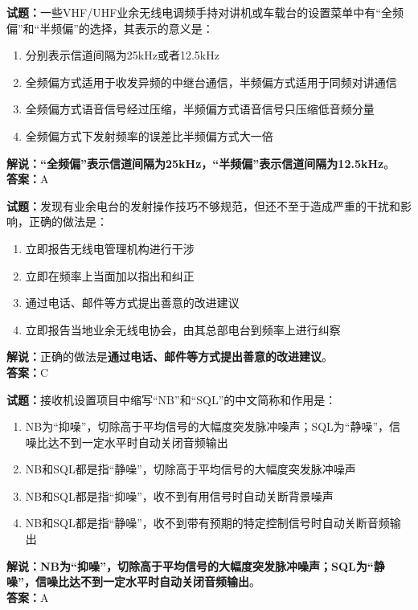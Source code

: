 \documentclass{ctexbook}
\begin{document}
\bigskip


\noindent\textbf{试题：}一些VHF/UHF业余无线电调频手持对讲机或车载台的设置菜单中有“全频偏”和“半频偏”的选择，其表示的意义是：
\begin{enumerate}[leftmargin=3em]
\item 分别表示信道间隔为25kHz或者12.5kHz
\item 全频偏方式适用于收发异频的中继台通信，半频偏方式适用于同频对讲通信
\item 全频偏方式语音信号经过压缩，半频偏方式语音信号只压缩低音频分量
\item 全频偏方式下发射频率的误差比半频偏方式大一倍
\end{enumerate}
\noindent\textbf{解说：}\textbf{“全频偏”表示信道间隔为25kHz，“半频偏”表示信道间隔为12.5kHz}。\\\noindent\textbf{答案：}A



\bigskip


\noindent\textbf{试题：}发现有业余电台的发射操作技巧不够规范，但还不至于造成严重的干扰和影响，正确的做法是：
\begin{enumerate}[leftmargin=3em]
\item 立即报告无线电管理机构进行干涉
\item 立即在频率上当面加以指出和纠正
\item 通过电话、邮件等方式提出善意的改进建议
\item 立即报告当地业余无线电协会，由其总部电台到频率上进行纠察
\end{enumerate}
\noindent\textbf{解说：}正确的做法是\textbf{通过电话、邮件等方式提出善意的改进建议}。\\\noindent\textbf{答案：}C


\bigskip


\noindent\textbf{试题：}接收机设置项目中缩写“NB”和“SQL”的中文简称和作用是：
\begin{enumerate}[leftmargin=3em]
\item NB为“抑噪”，切除高于平均信号的大幅度突发脉冲噪声；SQL为“静噪”，信噪比达不到一定水平时自动关闭音频输出
\item NB和SQL都是指“静噪”，切除高于平均信号的大幅度突发脉冲噪声
\item NB和SQL都是指“抑噪”，收不到有用信号时自动关断背景噪声
\item NB和SQL都是指“静噪”，收不到带有预期的特定控制信号时自动关断音频输出
\end{enumerate}
\noindent\textbf{解说：}\textbf{NB为“抑噪”，切除高于平均信号的大幅度突发脉冲噪声；SQL为“静噪”，信噪比达不到一定水平时自动关闭音频输出}。\\\noindent\textbf{答案：}A
\end{document}
